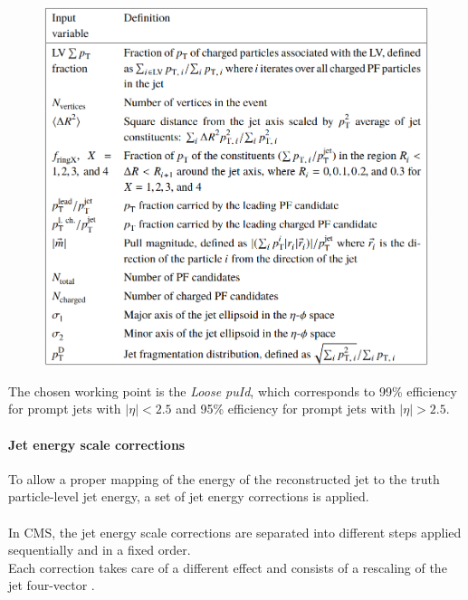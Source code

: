\begin{minipage}{\linewidth}
\begin{minipage}{0.35\linewidth}
    \end{minipage}
    \hfill
    \begin{minipage}{0.625\linewidth}
    \vspace{-1.65cm}
    \begin{figure}[H]
        \centering
        \includegraphics[width=\linewidth]{fig//chap07-selection/puid_bdt.png}
        \label{tab:puId_inputs}
    \end{figure}
        \vspace{0.1cm}
    \end{minipage}
\end{minipage}
The chosen working point is the \emph{Loose puId}, which corresponds to 99\%  efficiency for prompt jets with $|\eta| < 2.5$ and 95\% efficiency for prompt jets with $|\eta| > 2.5$.
\paragraph*{Jet energy scale corrections}
To allow a proper mapping of the energy of the reconstructed jet to the truth particle-level jet energy, a set of jet energy corrections is applied.\\
\\
In CMS, the jet energy scale corrections are separated into different steps applied sequentially and in a fixed order.\\
Each correction takes care of a different effect and consists of a rescaling of the jet four-vector \cite{2021Jet13TeV}.

